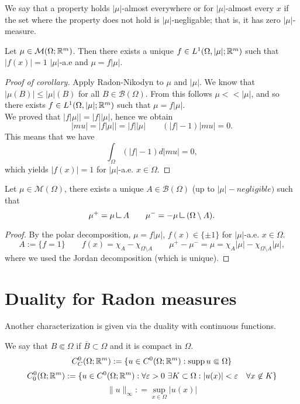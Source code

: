 \begin{definition} We say that a property holds $|\mu|$-almost everywhere or for
$|\mu|$-almost every $x$ if the set where the property does not hold is
$|\mu|$-negligable; that is, it has zero $|\mu|$-measure.
\end{definition}

\begin{corollary}
Let $\mu \in \mathcal{M}(\Omega;\mathbb{R}^m)$. Then there exists a unique $f \in
L^1(\Omega,|\mu|;\mathbb{R}^m)$ such that $|f(x)| =1 $ $|\mu|$-a.e and $\mu = f|\mu|$.
\end{corollary}

\begin{proof}[Proof of corollary]
Apply Radon-Nikodyn to $\mu$ and $|\mu|$. We know that 
\(
|\mu(B)| \leq |\mu|(B) 
\)
for all $B \in \mathcal{B}(\Omega)$. From this follows $\mu << |\mu|$, and so there exists $f \in L^{1}(\Omega, |\mu|; \mathbb{R}^{m})$ such that $\mu = f|\mu|$.
\\
We proved that $|f|\mu|| = |f||\mu|$, hence we obtain
\[
|mu| = |f|\mu|| = |f||\mu|
\qquad 
(|f| - 1)|mu| = 0.
\]
This means that we have
\[
\int_{\Omega}(|f| - 1)d|mu| = 0,
\]
which yields $|f(x)| =1$ for $|\mu|$-a.e. $x \in \Omega$. 
\end{proof}

\begin{corollary}
Let $\mu \in \mathcal{M}(\Omega)$, there exists a unique $A \in
\mathcal{B}(\Omega)$ (up to $|\mu|-negligible)$ such that 
\[
\mu^+ = \mu \res A
\qquad 
\mu^- = -\mu \res (\Omega \setminus A).
\]
\end{corollary}
\begin{proof}
By the polar decomposition, $\mu = f|\mu|$, $f(x) \in \{\pm 1\}$ for
$|\mu|$-a.e. $x\in\Omega$.
\[
A:= \{f =1 \} 
\qquad 
f(x) = \chi_A - \chi_{\Omega\setminus A}
\qquad
\mu^+ - \mu^- = \mu = \chi_A |\mu| - \chi_{\Omega\setminus A} |\mu|,
\]
where we used the Jordan decomposition (which is unique).
\end{proof}

\section{Duality for Radon measures}

Another characterization is given via the duality with continuous functions.

\begin{definition}
We say that $B \Subset \Omega$ if $\overline{B} \subset \Omega$ and it is
compact in $\Omega$.
\[
C^0_C(\Omega; \mathbb{R}^m) := \{u \in C^0(\Omega;\mathbb{R}^m) : \operatorname{supp} u \Subset \Omega \}
\]
\[
C^0_0(\Omega; \mathbb{R}^m) := \{u \in C^0(\Omega;\mathbb{R}^m) : \forall \varepsilon > 0 \
\exists K \subset \Omega: |u(x)| < \varepsilon \quad \forall x \not\in K 
\}
\]
\[
\|u\|_{\infty} : = \sup_{x \in \Omega} |u(x)|
\]
\end{definition}


